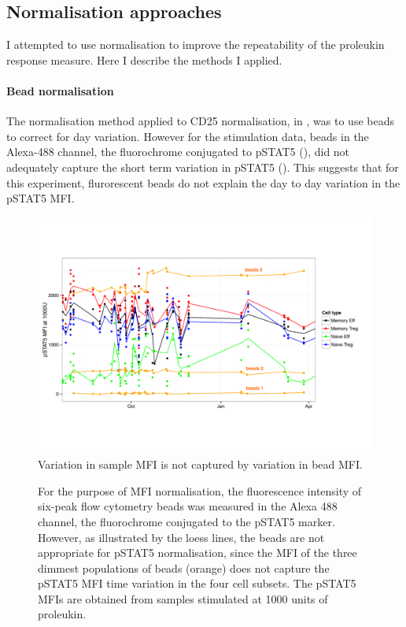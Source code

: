 \subsection{Normalisation approaches}

I attempted to use normalisation to improve the repeatability of the proleukin response measure.
Here I describe the methods I applied.

\paragraph{Bead normalisation} 
The normalisation method applied to CD25 normalisation,
in , was to use beads to correct for day variation.
However for the stimulation data, beads in the Alexa-488 channel, the fluorochrome conjugated to pSTAT5 (),
did not adequately capture the short term variation in pSTAT5 ().  
This suggests that for this experiment, flurorescent beads do not explain the day to day variation in the pSTAT5 MFI.
\begin{figure}[h]
    \centering
    \includegraphics[scale=.6]{figures/pstat5-beads.pdf}
    {Variation in sample MFI is not captured by variation in bead MFI.}
    {
      For the purpose of MFI normalisation, the fluorescence intensity of six-peak flow cytometry beads
      was measured in the Alexa 488 channel, the fluorochrome conjugated to the pSTAT5 marker.
      However, as illustrated by the loess lines, the beads are not appropriate for pSTAT5 normalisation,
      since the MFI of the three dimmest populations of beads (orange)
      does not capture the pSTAT5 MFI time variation in the four cell subsets.
      The pSTAT5 MFIs are obtained from samples stimulated at 1000 units of proleukin.
      
    }
\end{figure} 


